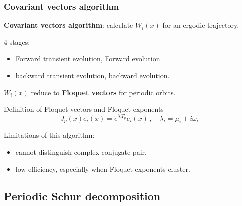 \documentclass[mathserif, handout]{beamer}
\begin{document}
\begin{frame}
  \frametitle{Covariant vectors algorithm \cite{GiChLiPo12}}
  
  \textbf{Covariant vectors algorithm}: calculate $W_i(x)$ for an ergodic 
  trajectory.
  \begin{exampleblock}{4 stages:}
    \begin{itemize}
    \item   Forward transient evolution, Forward evolution
    \item backward transient evolution, backward evolution.
    \end{itemize}
  \end{exampleblock}

  \pause 

  $W_i(x)$ reduce to \textbf{Floquet vectors} for periodic orbits.
  \begin{block}{Definition of Floquet vectors and Floquet exponents}
    \[
    J_p(x)e_i(x)=e^{\lambda_i T_p}e_i(x)\,,
    \quad \lambda_i = \mu_i + i\omega_i
    \]
  \end{block}

  \pause
  
  {\color{green} Limitations of this algorithm:}
  \begin{itemize}
  \item cannot distinguish complex conjugate pair.
  \item low efficiency, especially when Floquet exponents cluster. 
  \end{itemize}
  
\end{frame}

\subsection{Periodic Schur decomposition}
\end{document}

